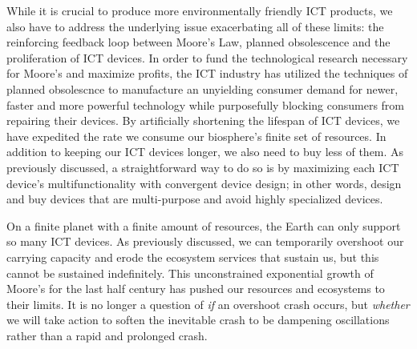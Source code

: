 \documentclass{article}
\begin{document}
While it is crucial to produce more environmentally friendly ICT products, we also have to address the underlying issue exacerbating all of these limits: the reinforcing feedback loop between Moore's Law, planned obsolescence and the proliferation of ICT devices. In order to fund the technological research necessary for Moore's and maximize profits, the ICT industry has utilized the techniques of planned obsolescnce to manufacture an unyielding consumer demand for newer, faster and more powerful technology while purposefully blocking consumers from repairing their devices. By artificially shortening the lifespan of ICT devices, we have expedited the rate we consume our biosphere’s finite set of resources. In addition to keeping our ICT devices longer, we also need to buy less of them. As previously discussed, a straightforward way to do so is by maximizing each ICT device's multifunctionality with convergent device design; in other words, design and buy devices that are multi-purpose and avoid highly specialized devices.


On a finite planet with a finite amount of resources, the Earth can only support so many ICT devices. As previously discussed, we can temporarily overshoot our carrying capacity and erode the ecosystem services that sustain us, but this cannot be sustained indefinitely. 
This unconstrained exponential growth of Moore's for the last half century has pushed our resources and ecosystems to their limits. It is no longer a question of \textit{if} an overshoot crash occurs, but \textit{whether} we will take action to soften the inevitable crash to be dampening oscillations rather than a rapid and prolonged crash.



\cleardoublepage



\cleardoublepage
\appendix
\end{document}
